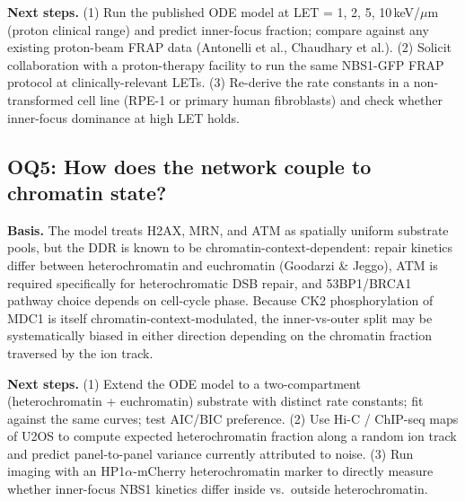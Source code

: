 \textbf{Next steps.}
(1) Run the published ODE model at LET = 1, 2, 5, 10\,keV/$\mu$m (proton clinical range)
and predict inner-focus fraction; compare against any existing proton-beam FRAP data
(Antonelli et al., Chaudhary et al.).
(2) Solicit collaboration with a proton-therapy facility to run the same NBS1-GFP FRAP
protocol at clinically-relevant LETs.
(3) Re-derive the rate constants in a non-transformed cell line (RPE-1 or primary human
fibroblasts) and check whether inner-focus dominance at high LET holds.

\subsection*{OQ5: How does the network couple to chromatin state?}
\textbf{Basis.} The model treats H2AX, MRN, and ATM as spatially uniform substrate pools,
but the DDR is known to be chromatin-context-dependent: repair kinetics differ between
heterochromatin and euchromatin (Goodarzi \& Jeggo), ATM is required specifically for
heterochromatic DSB repair, and 53BP1/BRCA1 pathway choice depends on cell-cycle phase.
Because CK2 phosphorylation of MDC1 is itself chromatin-context-modulated, the
inner-vs-outer split may be systematically biased in either direction depending on the
chromatin fraction traversed by the ion track.

\textbf{Next steps.}
(1) Extend the ODE model to a two-compartment (heterochromatin + euchromatin) substrate with
distinct rate constants; fit against the same curves; test AIC/BIC preference.
(2) Use Hi-C / ChIP-seq maps of U2OS to compute expected heterochromatin fraction along a
random ion track and predict panel-to-panel variance currently attributed to noise.
(3) Run imaging with an HP1$\alpha$-mCherry heterochromatin marker to directly measure
whether inner-focus NBS1 kinetics differ inside vs.\ outside heterochromatin.

